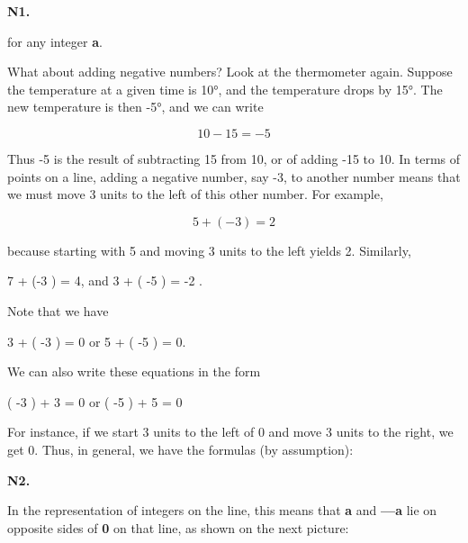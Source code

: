 \documentclass[paper=a4,oneside,fontsize=12pt, parskip=full]{scrartcl}
\begin{document}
    \noindent \textbf{N1.} \hspace{6cm} 

    for any integer \textbf{a}.

    What about adding negative numbers?
    Look at the thermometer again.
    Suppose the temperature at a given time is 10°, and the temperature drops by 15°.
    The new temperature is then -5°, and we can write

    \[10-15=-5\]

    Thus -5 is the result of subtracting 15 from 10, or of adding -15 to 10.
    In terms of points on a line, adding a negative number, say -3, to another
    number means that we must move 3 units to the left of this other number.
    For example,

    \[5+(-3)=2\]

    because starting with 5 and moving 3 units to the left yields 2.
    Similarly,

    \begin{center}
        7 + (-3 ) = 4, and 3 + ( -5 ) = -2 .
    \end{center}

    Note that we have

    \begin{center}
        3 + ( -3 ) = 0 or 5 + ( -5 ) = 0.
    \end{center}

    We can also write these equations in the form
    \begin{center}
    ( -3 )
        + 3 = 0 or ( -5 ) + 5 = 0
    \end{center}

    For instance, if we start 3 units to the left of 0 and move 3 units to the right, we get 0.
    Thus, in general, we have the formulas (by assumption):

    \noindent \textbf{N2.} \hspace{4cm} 

    In the representation of integers on the line, this means that \textbf{a} and \textbf{—a} lie
    on opposite sides of \textbf{0} on that line, as shown on the next picture:

    \begin{center}
    \end{center}
\end{document}
